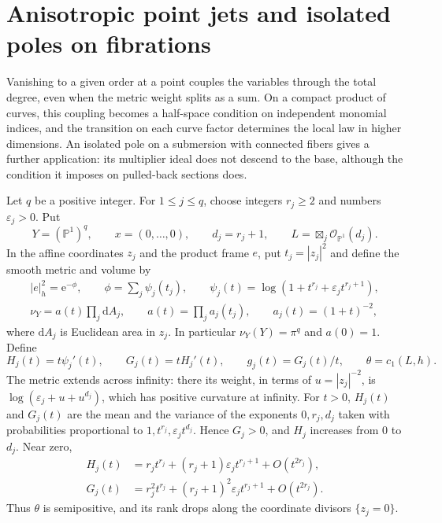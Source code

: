 \section{Anisotropic point jets and isolated poles on fibrations}
\label{sec:anisotropic-growing-jets}

Vanishing to a given order at a point couples the variables through the total degree, even when the metric weight splits as a sum. On a compact product of curves, this coupling becomes a half-space condition on independent monomial indices, and the transition on each curve factor determines the local law in higher dimensions. An isolated pole on a submersion with connected fibers gives a further application: its multiplier ideal does not descend to the base, although the condition it imposes on pulled-back sections does.

Let $q$ be a positive integer. For $1\leq j\leq q$, choose integers $r_j\geq2$ and numbers $\varepsilon_j>0$. Put
\[
 Y=(\mathbb P^1)^q,\qquad x=(0,\ldots,0),\qquad
 d_j=r_j+1,\qquad L=\boxtimes_j\mathcal O_{\mathbb P^1}(d_j).
\]
In the affine coordinates $z_j$ and the product frame $e$, put $t_j=|z_j|^2$ and define the smooth metric and volume by
\[
 \begin{gathered}
 |e|_h^2=\mathrm e^{-\phi},\qquad
 \phi=\sum_j\psi_j(t_j),\qquad
 \psi_j(t)=\log(1+t^{r_j}+\varepsilon_jt^{r_j+1}),\\
 \nu_Y=a(t)\prod_j\mathrm dA_j,\qquad
 a(t)=\prod_j a_j(t_j),\qquad a_j(t)=(1+t)^{-2},
 \end{gathered}
\]
where $\mathrm dA_j$ is Euclidean area in $z_j$. In particular $\nu_Y(Y)=\pi^q$ and $a(0)=1$. Define
\[
 H_j(t)=t\psi_j'(t),\qquad G_j(t)=tH_j'(t),\qquad
 g_j(t)=G_j(t)/t,\qquad \theta=c_1(L,h).
\]
The metric extends across infinity: there its weight, in terms of $u=|z_j|^{-2}$, is $\log(\varepsilon_j+u+u^{d_j})$, which has positive curvature at infinity. For $t>0$, $H_j(t)$ and $G_j(t)$ are the mean and the variance of the exponents $0,r_j,d_j$ taken with probabilities proportional to $1,t^{r_j},\varepsilon_jt^{d_j}$. Hence $G_j>0$, and $H_j$ increases from $0$ to $d_j$. Near zero,
\begin{equation}\label{eq:anisotropic-weight-expansion}
 \begin{aligned}
 H_j(t)&=r_jt^{r_j}+(r_j+1)\varepsilon_jt^{r_j+1}+O(t^{2r_j}),\\
 G_j(t)&=r_j^2t^{r_j}+(r_j+1)^2\varepsilon_jt^{r_j+1}+O(t^{2r_j}).
 \end{aligned}
\end{equation}
Thus $\theta$ is semipositive, and its rank drops along the coordinate divisors $\{z_j=0\}$.

